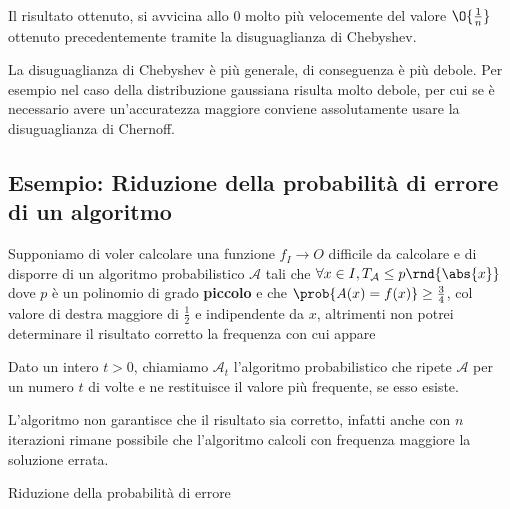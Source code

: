 \documentclass[\main/main.tex]{subfiles}
\begin{document}
Il risultato ottenuto, si avvicina allo \(0\) molto più velocemente del valore \(\O{\frac{1}{n}}\) ottenuto precedentemente tramite la disuguaglianza di Chebyshev.

La disuguaglianza di Chebyshev è più generale, di conseguenza è più debole. Per esempio nel caso della distribuzione gaussiana risulta molto debole, per cui se è necessario avere un'accuratezza maggiore conviene assolutamente usare la disuguaglianza di Chernoff.

\subsection{Esempio: Riduzione della probabilità di errore di un algoritmo}
Supponiamo di voler calcolare una funzione \(f_ I \rightarrow O\) difficile da calcolare e di disporre di un algoritmo probabilistico \(\mathcal{A}\) tali che \(\forall x \in I, T_{\mathcal{A}} \leq p\rnd{\abs{x}}\) dove \(p\) è un polinomio di grado \textbf{piccolo} e che \(\prob{A(x) = f(x)} \geq \frac{3}{4}\), col valore di destra maggiore di \(\frac{1}{2}\) e indipendente da \(x\), altrimenti non potrei determinare il risultato corretto la frequenza con cui appare

Dato un intero \(t > 0\), chiamiamo \(\mathcal{A}_t\) l'algoritmo probabilistico che ripete \(\mathcal{A}\) per un numero \(t\) di volte e ne restituisce il valore più frequente, se esso esiste.

L'algoritmo non garantisce che il risultato sia corretto, infatti anche con \(n\) iterazioni rimane possibile che l'algoritmo calcoli con frequenza maggiore la soluzione errata.

\IncMargin{1em}
\begin{algorithm}
  \BlankLine
  \caption{Riduzione della probabilità di errore}\label{algo_disjdecomp}
\end{algorithm}\DecMargin{1em}
\end{document}
